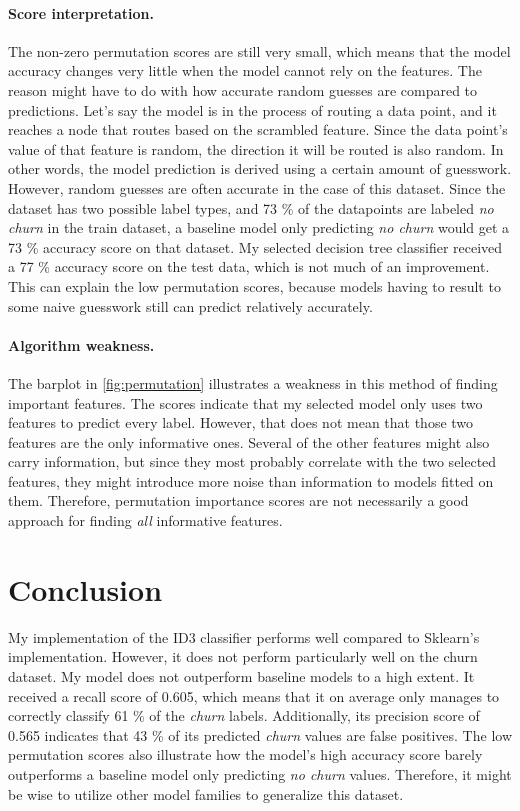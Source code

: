 \documentclass{article}
\begin{document}
\paragraph{Score interpretation.} 
The non-zero permutation scores are still very small, 
which means that the model accuracy changes very little when the model cannot rely on the features.
The reason might have to do with how accurate random guesses are compared to predictions.
Let's say the model is in the process of routing a data point, and it reaches a node that routes
based on the scrambled feature.
Since the data point's value of that feature is random,
the direction it will be routed is also random.
In other words, the model prediction is derived using a certain amount of guesswork.
However, random guesses are often accurate in the case of this dataset.
Since the dataset has two possible label types, and 73 \% of the datapoints are labeled \textit{no churn}
in the train dataset,
a baseline model only predicting \textit{no churn} would get a 73 \% accuracy score on that dataset.
My selected decision tree classifier received a 77 \% accuracy score on the test data,
which is not much of an improvement.
This can explain the low permutation scores, because models having to result to 
some naive guesswork still can predict relatively accurately.

\paragraph{Algorithm weakness.}
The barplot in \autoref{fig:permutation} 
illustrates a weakness in this method of finding important features.
The scores indicate that my selected model only uses two features to predict every label.
However, that does not mean that those two features are the only informative ones.
Several of the other features might also carry information, but since they most probably
correlate with the two selected features, they might introduce more noise than information
to models fitted on them.
Therefore, permutation importance scores are not necessarily a good approach for finding
\textit{all} informative features.

\section{Conclusion}

My implementation of the ID3 classifier performs well compared to Sklearn's implementation.
However, it does not perform particularly well on the churn dataset.
My model does not outperform baseline models to a high extent.
It received a recall score of 0.605, which means that it on average only manages to 
correctly classify 61 \% of the \textit{churn} labels. Additionally, its precision score
of 0.565 indicates that 43 \% of its predicted \textit{churn} values are false positives.
The low permutation scores also illustrate how the model's high accuracy score
barely outperforms a baseline model only predicting \textit{no churn} values.
Therefore, it might be wise to utilize other model families to generalize
this dataset.
\end{document}
